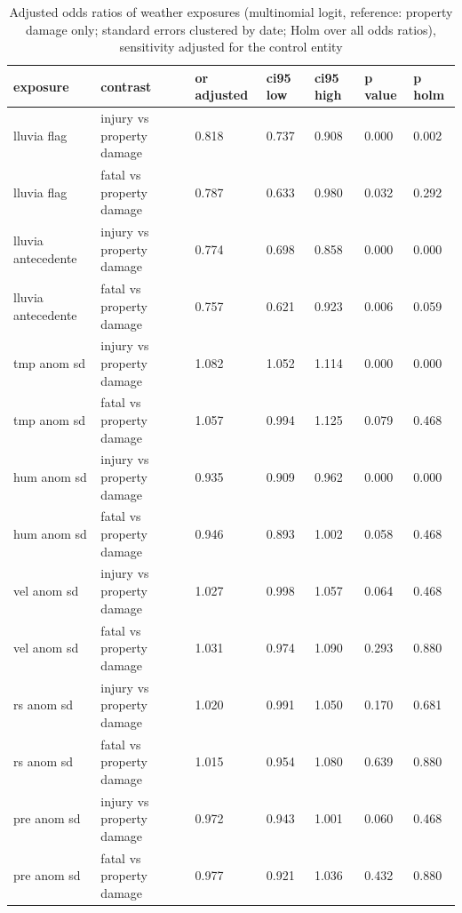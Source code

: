 \begin{table}[htbp]
\centering
\caption{Adjusted odds ratios of weather exposures (multinomial logit, reference: property damage only; standard errors clustered by date; Holm over all odds ratios), sensitivity adjusted for the control entity}
\label{tab:table5_associative_odds_ratios_entity_adjusted}
\begin{tabular}{lllllll}
\toprule
\textbf{exposure} & \textbf{contrast} & \textbf{or adjusted} & \textbf{ci95 low} & \textbf{ci95 high} & \textbf{p value} & \textbf{p holm} \\
\midrule
lluvia flag & injury vs property damage & 0.818 & 0.737 & 0.908 & 0.000 & 0.002 \\
lluvia flag & fatal vs property damage & 0.787 & 0.633 & 0.980 & 0.032 & 0.292 \\
lluvia antecedente & injury vs property damage & 0.774 & 0.698 & 0.858 & 0.000 & 0.000 \\
lluvia antecedente & fatal vs property damage & 0.757 & 0.621 & 0.923 & 0.006 & 0.059 \\
tmp anom sd & injury vs property damage & 1.082 & 1.052 & 1.114 & 0.000 & 0.000 \\
tmp anom sd & fatal vs property damage & 1.057 & 0.994 & 1.125 & 0.079 & 0.468 \\
hum anom sd & injury vs property damage & 0.935 & 0.909 & 0.962 & 0.000 & 0.000 \\
hum anom sd & fatal vs property damage & 0.946 & 0.893 & 1.002 & 0.058 & 0.468 \\
vel anom sd & injury vs property damage & 1.027 & 0.998 & 1.057 & 0.064 & 0.468 \\
vel anom sd & fatal vs property damage & 1.031 & 0.974 & 1.090 & 0.293 & 0.880 \\
rs anom sd & injury vs property damage & 1.020 & 0.991 & 1.050 & 0.170 & 0.681 \\
rs anom sd & fatal vs property damage & 1.015 & 0.954 & 1.080 & 0.639 & 0.880 \\
pre anom sd & injury vs property damage & 0.972 & 0.943 & 1.001 & 0.060 & 0.468 \\
pre anom sd & fatal vs property damage & 0.977 & 0.921 & 1.036 & 0.432 & 0.880 \\
\bottomrule
\end{tabular}
\end{table}